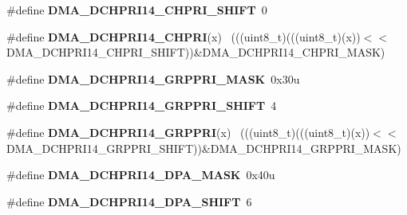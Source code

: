 \begin{DoxyCompactItemize}
\item 
\hypertarget{group___d_m_a___register___masks_ga160b69c2c8a275120fefd8970b4731f5}{}\#define {\bfseries D\+M\+A\+\_\+\+D\+C\+H\+P\+R\+I14\+\_\+\+C\+H\+P\+R\+I\+\_\+\+S\+H\+I\+F\+T}~0\label{group___d_m_a___register___masks_ga160b69c2c8a275120fefd8970b4731f5}

\item 
\hypertarget{group___d_m_a___register___masks_ga42a00acd3f16389cf46de1a8e9bcbae0}{}\#define {\bfseries D\+M\+A\+\_\+\+D\+C\+H\+P\+R\+I14\+\_\+\+C\+H\+P\+R\+I}(x)                                    ~(((uint8\+\_\+t)(((uint8\+\_\+t)(x))$<$$<$D\+M\+A\+\_\+\+D\+C\+H\+P\+R\+I14\+\_\+\+C\+H\+P\+R\+I\+\_\+\+S\+H\+I\+F\+T))\&D\+M\+A\+\_\+\+D\+C\+H\+P\+R\+I14\+\_\+\+C\+H\+P\+R\+I\+\_\+\+M\+A\+S\+K)\label{group___d_m_a___register___masks_ga42a00acd3f16389cf46de1a8e9bcbae0}

\item 
\hypertarget{group___d_m_a___register___masks_ga59ab1978fe99d3fa2e5b7da5bfd9935c}{}\#define {\bfseries D\+M\+A\+\_\+\+D\+C\+H\+P\+R\+I14\+\_\+\+G\+R\+P\+P\+R\+I\+\_\+\+M\+A\+S\+K}~0x30u\label{group___d_m_a___register___masks_ga59ab1978fe99d3fa2e5b7da5bfd9935c}

\item 
\hypertarget{group___d_m_a___register___masks_gaa7cd37ff8918e793c9d6a29d4a60496c}{}\#define {\bfseries D\+M\+A\+\_\+\+D\+C\+H\+P\+R\+I14\+\_\+\+G\+R\+P\+P\+R\+I\+\_\+\+S\+H\+I\+F\+T}~4\label{group___d_m_a___register___masks_gaa7cd37ff8918e793c9d6a29d4a60496c}

\item 
\hypertarget{group___d_m_a___register___masks_ga875883bfc42b46ed29fe1ad606bb68f3}{}\#define {\bfseries D\+M\+A\+\_\+\+D\+C\+H\+P\+R\+I14\+\_\+\+G\+R\+P\+P\+R\+I}(x)                                  ~(((uint8\+\_\+t)(((uint8\+\_\+t)(x))$<$$<$D\+M\+A\+\_\+\+D\+C\+H\+P\+R\+I14\+\_\+\+G\+R\+P\+P\+R\+I\+\_\+\+S\+H\+I\+F\+T))\&D\+M\+A\+\_\+\+D\+C\+H\+P\+R\+I14\+\_\+\+G\+R\+P\+P\+R\+I\+\_\+\+M\+A\+S\+K)\label{group___d_m_a___register___masks_ga875883bfc42b46ed29fe1ad606bb68f3}

\item 
\hypertarget{group___d_m_a___register___masks_ga73cb4f5a8c28574c6d7b9548811bde25}{}\#define {\bfseries D\+M\+A\+\_\+\+D\+C\+H\+P\+R\+I14\+\_\+\+D\+P\+A\+\_\+\+M\+A\+S\+K}~0x40u\label{group___d_m_a___register___masks_ga73cb4f5a8c28574c6d7b9548811bde25}

\item 
\hypertarget{group___d_m_a___register___masks_ga1dd167f78a3ed39d0858085f54286371}{}\#define {\bfseries D\+M\+A\+\_\+\+D\+C\+H\+P\+R\+I14\+\_\+\+D\+P\+A\+\_\+\+S\+H\+I\+F\+T}~6\label{group___d_m_a___register___masks_ga1dd167f78a3ed39d0858085f54286371}


\end{DoxyCompactItemize}
